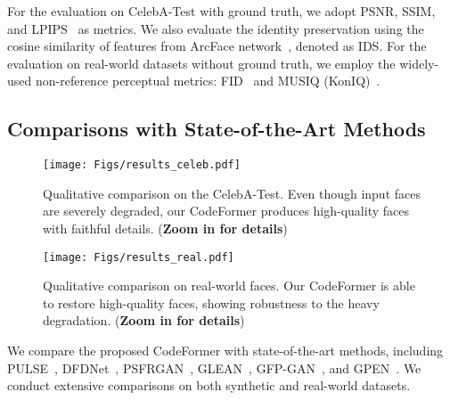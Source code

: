 For the evaluation on CelebA-Test with ground truth, we adopt PSNR, SSIM, and LPIPS~\cite{zhang2018unreasonable} as metrics.
We also evaluate the identity preservation using the cosine similarity of features from ArcFace network~\cite{deng2019arcface}, denoted as IDS.
For the evaluation on real-world datasets without ground truth, we employ the widely-used non-reference perceptual metrics: FID~\cite{heusel2017gans} and MUSIQ (KonIQ)~\cite{ke2021musiq}.
\subsection{Comparisons with State-of-the-Art Methods}
\begin{figure*}[t]
	\vspace{-1mm}
	\centering
	\texttt{[image: Figs/results\_celeb.pdf]}
	\vspace{-5mm}
	\caption{Qualitative comparison on the CelebA-Test. Even though input faces are severely degraded, our CodeFormer produces high-quality faces with faithful details. (\textbf{Zoom in for details})}
	\label{fig:celeb_compare}
	\vspace{-1mm}
\end{figure*}
\begin{figure*}[t]
 	\vspace{-1mm}
	\centering
	\texttt{[image: Figs/results\_real.pdf]}
	\vspace{-5mm}
	\caption{Qualitative comparison on real-world faces. Our CodeFormer is able to restore high-quality faces, showing robustness to the heavy degradation. (\textbf{Zoom in for details})}
	\label{fig:real_compare}
	\vspace{-3mm}
\end{figure*}
We compare the proposed CodeFormer with state-of-the-art methods, including PULSE~\cite{menon2020pulse}, DFDNet~\cite{li2020blind}, PSFRGAN~\cite{chen2021progressive}, GLEAN~\cite{chan2022glean}, GFP-GAN~\cite{wang2021towards}, and GPEN~\cite{yang2021gan}. We conduct extensive comparisons on both synthetic and real-world datasets. 
